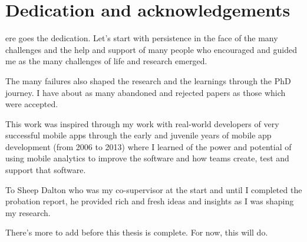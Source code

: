 %
%

\chapter*{Dedication and acknowledgements}
\label{the-acknowledgements}
\begin{SingleSpace}
ere goes the dedication. Let's start with persistence in the face of the many challenges and the help and support of many people who encouraged and guided me as the many challenges of life and research emerged.

The many failures also shaped the research and the learnings through the PhD journey. I have about as many abandoned and rejected papers as those which were accepted. 

This work was inspired through my work with real-world developers of very successful mobile apps through the early and juvenile years of mobile app development (from 2006 to 2013) where I learned of the power and potential of using mobile analytics to improve the software and how teams create, test and support that software.

To Sheep Dalton who was my co-supervisor at the start and until I completed the probation report, he  provided rich and fresh ideas and insights as I was shaping my research.

There's more to add before this thesis is complete. For now, this will do.
\end{SingleSpace}
\clearpage